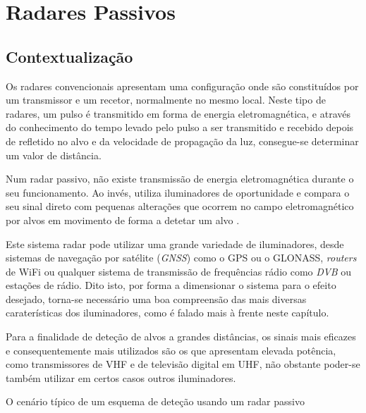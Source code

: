 
\chapter{Radares Passivos} %

\label{chap:Chapter2} %


\section{Contextualização}
Os radares convencionais apresentam uma configuração onde são constituídos por um transmissor e um recetor, normalmente no mesmo local. Neste tipo de radares, um pulso é transmitido em forma de energia eletromagnética, e através do conhecimento do tempo levado pelo pulso a ser transmitido e recebido depois de refletido no alvo e da velocidade de propagação da luz, consegue-se determinar um valor de distância.\par 
Num radar passivo, não existe transmissão de energia eletromagnética durante o seu funcionamento. Ao invés, utiliza iluminadores de oportunidade e compara o seu sinal direto com pequenas alterações que ocorrem no campo eletromagnético por alvos em movimento de forma a detetar um alvo \parencite{Griffiths2017}.\par 
Este sistema radar pode utilizar uma grande variedade de iluminadores, desde sistemas de navegação por satélite (\textit{\gls{GNSS}}) como o \gls{GPS} ou o GLONASS, \textit{routers} de WiFi ou qualquer sistema de transmissão de frequências rádio como \textit{\gls{DVB}} ou estações de rádio. Dito isto, por forma a dimensionar o sistema para o efeito desejado, torna-se necessário uma boa compreensão das mais diversas caraterísticas dos iluminadores, como é falado mais à frente neste capítulo.\par 
Para a finalidade de deteção de alvos a grandes distâncias, os sinais mais eficazes e consequentemente mais utilizados são os que apresentam elevada potência, como transmissores de \gls{VHF} e de televisão digital em \gls{UHF}, não obstante poder-se também utilizar em certos casos outros iluminadores.\par
O cenário típico de um esquema de deteção usando um radar passivo 


